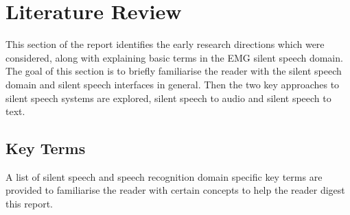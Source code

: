 \iffalse
Mark Scheme:
- Extensive Research
- Understanding of complex subject matter
- Identifies flaws, gaps or inconsistencies in extant knowledge
\fi

\iffalse

Mu-Law compression:
- compresses audio signal into discrete bins whilst preserving dynamic range

Current sEMG Silent Speech Text Classification Research:
- https://dspace.mit.edu/bitstream/handle/1721.1/123121/1128187233-MIT.pdf?sequence=1&isAllowed=y

\fi

\chapter{Literature Review} \label{chap:lit-review}

This section of the report identifies the early research directions which were considered,
along with explaining basic terms in the EMG silent speech domain. The goal of this section
is to briefly familiarise the reader with the silent speech domain and silent speech
interfaces in general. Then the two key approaches to silent speech systems are explored,
silent speech to audio and silent speech to text.

\section{Key Terms}

A list of silent speech and speech recognition domain specific key terms are provided
to familiarise the reader with certain concepts to help the reader digest this report.


